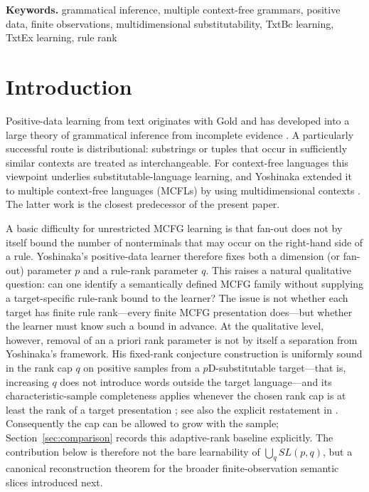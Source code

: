 \documentclass[11pt,a4paper]{article}
\numberwithin{equation}{section}
\theoremstyle{plain}
\theoremstyle{definition}
\theoremstyle{remark}
\providecommand{\keywords}[1]{\par\smallskip\noindent\textbf{Keywords. }#1\par}
\begin{document}
\keywords{grammatical inference, multiple context-free grammars, positive data, finite observations, multidimensional substitutability, TxtBc learning, TxtEx learning, rule rank}

\section{Introduction}
\label{sec:introduction}

Positive-data learning from text originates with Gold and has developed into a
large theory of grammatical inference from incomplete evidence
\cite{Gold1967,Angluin1980,Angluin1982Reversible}.  A particularly successful
route is distributional: substrings or tuples that occur in sufficiently
similar contexts are treated as interchangeable.  For context-free languages
this viewpoint underlies substitutable-language learning, and Yoshinaka
extended it to multiple context-free languages (MCFLs) by using
multidimensional contexts \cite{ClarkEyraud2007,Yoshinaka2008,Yoshinaka2009,Yoshinaka2011}.
The latter work is the closest predecessor of the present paper.

A basic difficulty for unrestricted MCFG learning is that fan-out does not by
itself bound the number of nonterminals that may occur on the right-hand side
of a rule.  Yoshinaka's positive-data learner therefore fixes both a dimension
(or fan-out) parameter $p$ and a rule-rank parameter $q$.  This raises a
natural qualitative question: can one identify a semantically defined MCFG
family without supplying a target-specific rule-rank bound to the learner?
The issue is not whether each target has finite rule rank---every finite MCFG
presentation does---but whether the learner must know such a bound in advance.
At the qualitative level, however, removal of an a priori rank parameter is
not by itself a separation from Yoshinaka's framework.  His fixed-rank
conjecture construction is uniformly sound in the rank cap $q$ on positive
samples from a $p$D-substitutable target---that is, increasing $q$ does not
introduce words outside the target language---and its characteristic-sample
completeness applies whenever the chosen rank cap is at least the rank of a
target presentation \cite{Yoshinaka2011}; see also the explicit restatement in
\cite[Proposition~1]{CaseYoshinakaZeugmann2013}.  Consequently the cap can be allowed to grow with the
sample; Section~\ref{sec:comparison} records this adaptive-rank baseline
explicitly.  The contribution below is therefore not the bare learnability of
$\bigcup_q SL(p,q)$, but a canonical reconstruction theorem for the broader
finite-observation semantic slices introduced next.
\end{document}
